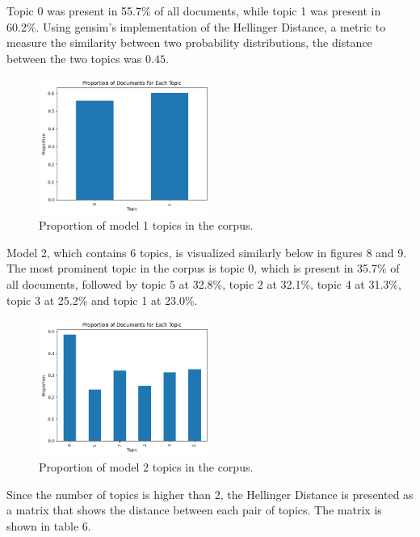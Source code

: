Topic 0 was present in 55.7\% of all documents, while topic 1 was present in 60.2\%. Using gensim's implementation of the Hellinger Distance, a metric to measure the similarity between two probability distributions, the distance between the two topics was $0.45$.

\begin{figure}[H]
    \centering
    \includegraphics[width=0.5\textwidth]{resources/proportion_n_2.png}
    \caption{Proportion of model 1 topics in the corpus.}
    \label{fig:proportion_n_2}
\end{figure}

Model 2, which contains 6 topics, is visualized similarly below in figures 8 and 9. The most prominent topic in the corpus is topic 0, which is present in 35.7\% of all documents, followed by topic 5 at 32.8\%, topic 2 at 32.1\%, topic 4 at 31.3\%, topic 3 at 25.2\% and topic 1 at 23.0\%.

\begin{figure}[H]
    \centering
    \includegraphics[width=0.5\textwidth]{resources/proportion_n_6.png}
    \caption{Proportion of model 2 topics in the corpus.}
    \label{fig:proportion_n_6}
\end{figure}

Since the number of topics is higher than 2, the Hellinger Distance is presented as a matrix that shows the distance between each pair of topics. The matrix is shown in table 6.

